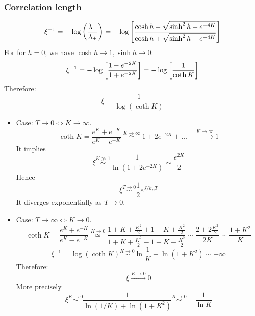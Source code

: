 \documentclass[../main/main.tex]{subfiles}
\begin{document}
\subsubsection{Correlation length}
\begin{equation}
  \xi ^{-1} = -\log{\qty(\frac{\lambda _-}{\lambda _+}) } = - \log{\qty[ \frac{\cosh h - \sqrt{\sinh^2 h + e^{-4K} } }{\cosh h + \sqrt{\sinh^2 h + e^{-4K} }}] }
\end{equation}
For  for \( h=0 \), we have \( \cosh h \rightarrow 1, \sinh h \rightarrow 0 \):
\begin{equation}
  \xi ^{-1} = - \log{\qty[\frac{1- e^{-2K} }{1+ e^{-2K} }] } =  - \log{\qty[\frac{1 }{\coth K }] }
\end{equation}
Therefore:
\begin{equation}
  \xi = \frac{1}{\log{ (\coth K )} }
\end{equation}
\begin{itemize}
\item Case: \( T \rightarrow 0 \Leftrightarrow K \rightarrow \infty  \).
\begin{equation}
  \coth K = \frac{e^{K} + e^{-K}  }{e^{K} - e^{-K}  } \overset{K \rightarrow \infty }{\simeq} 1 + 2 e^{-2K} + \dots \quad \overset{K \rightarrow \infty }{ \longrightarrow  } 1
\end{equation}
It implies
\begin{equation}
  \xi \overset{K \gg 1}{\sim } \frac{1}{\ln{(1+ 2 e^{-2K} )} } \sim \frac{e^{2K} }{2}
\end{equation}
Hence
\begin{equation}
  \xi \overset{T \rightarrow 0}{\sim } \frac{1}{2} e^{J/k_B T}
\end{equation}
It diverges exponentially as \( T \rightarrow 0 \).
\item Case: \( T \rightarrow \infty \Leftrightarrow K \rightarrow 0 \).
\begin{equation}
  \coth K = \frac{e^{K} + e^{-K}  }{e^{K} - e^{-K}  } \overset{K \rightarrow 0 }{\simeq}
  \frac{1+K+\frac{K^2}{2}+1-K+\frac{K^2}{2}}{1+K+\frac{K^2}{2}-1+K-\frac{K^2}{2}}
  \sim \frac{2+2 \frac{K^2}{2}}{2K} \sim \frac{1+K^2}{K}
\end{equation}
\begin{equation}
  \xi ^{-1} = \log{(\coth K)} \overset{K \rightarrow 0}{\sim } \ln{\frac{1}{K}} + \ln{(1+K^2)} \sim + \infty
\end{equation}
Therefore:
\begin{equation}
  \xi  \overset{K \rightarrow 0}{\longrightarrow} 0
\end{equation}
More precisely
\begin{equation}
  \xi \overset{K \rightarrow 0}{\sim } \frac{1}{\ln{(1/K)} + \ln{(1+K^2)}  } \overset{K \rightarrow 0}{\sim } - \frac{1}{\ln{K} }
\end{equation}

\end{itemize}
\end{document}
